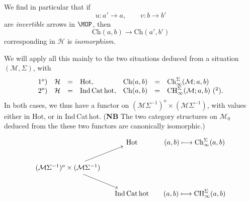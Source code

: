 We find in particular that if
\[
u : a'\longrightarrow a, \qquad v : b\longrightarrow b'
\]
are \textit{invertible} arrows in $\MOP$, then
\[
\mathrm{Ch}(a,b)\longrightarrow\mathrm{Ch}(a',b')
\]
corresponding in $\mathcal{H}$ is \textit{isomorphism.}

We will apply all this mainly to the two situations deduced from a situation $(\mathcal{M},\Sigma)$, with
\[
\begin{array}{rlcllcl}
1^o) & \mathcal{H} & = & \mathrm{Hot}, & \mathrm{Ch}(a,b) & = & \mathrm{Ch}^{\Sigma}_{\infty}(\mathcal{M};a,b)\\
2^o) & \mathcal{H} & = & \mathrm{Ind\,Cat\,hot}, & \mathrm{Ch}(a,b) & = & \mathrm{CH}^{\Sigma}_{\infty}(\mathcal{M};a,b)\ \text{(\footnotemark[2])}.
\end{array}
\]
In both cases, we thus have a functor on $(\mathcal{M}\Sigma^{-1})^o\times(\mathcal{M}\Sigma^{-1})$, with values either in Hot, or in Ind\,Cat\,hot. (\textbf{NB} The two category structures on $\mathcal{M}_0$ deduced from the %
these two functors are canonically isomorphic.)
\[
\begin{tikzcd}[column sep=small]
 & \mathrm{Hot} & (a,b)\longmapsto\mathrm{Ch}^{\Sigma}_{\infty}(a,b)\\
(\mathcal{M}\Sigma^{-1})^o\times(\mathcal{M}\Sigma^{-1}) \arrow[ur] \arrow[dr] & & \\
 & \mathrm{Ind\,Cat\,hot} & (a,b)\longmapsto\mathrm{CH}^{\Sigma}_{\infty}(a,b)
\end{tikzcd}
\]

